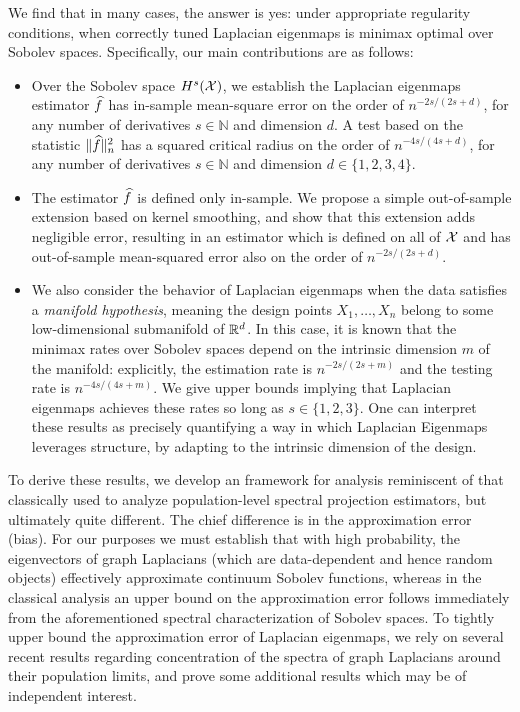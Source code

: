 We find that in many cases, the answer is yes: under appropriate regularity conditions, when correctly tuned Laplacian eigenmaps is minimax optimal over Sobolev spaces. Specifically, our main contributions are as follows:
\begin{itemize}
	\item Over the Sobolev space $H^{s}(\mathcal{X})$, we establish the Laplacian eigenmaps estimator $\widehat{f}$ has in-sample mean-square error on the order of $n^{-2s/(2s + d)}$, for any number of derivatives $s \in \mathbb{N}$ and dimension $d$. A test based on the statistic $\|\widehat{f}\|_n^2$ has a squared critical radius on the order of $n^{-4s/(4s + d)}$, for any number of derivatives $s \in \mathbb{N}$ and dimension $d \in \{1,2,3,4\}$. 
	\item The estimator $\widehat{f}$ is defined only in-sample. We propose a simple out-of-sample extension based on kernel smoothing, and show that this extension adds negligible error, resulting in an estimator which is defined on all of $\mathcal{X}$ and has out-of-sample mean-squared error also on the order of $n^{-2s/(2s + d)}$.
	\item We also consider the behavior of Laplacian eigenmaps when the data satisfies a \emph{manifold hypothesis}, meaning the design points $X_1,\ldots,X_n$ belong to some low-dimensional submanifold of $\mathbb{R}^d$. In this case, it is known that the minimax rates over Sobolev spaces depend on the intrinsic dimension $m$ of the manifold: explicitly, the estimation rate is $n^{-2s/(2s + m)}$ and the testing rate is $n^{-4s/(4s + m)}$. We give upper bounds implying that Laplacian eigenmaps achieves these rates so long as $s \in \{1,2,3\}$. One can interpret these results as precisely quantifying a way in which Laplacian Eigenmaps leverages structure, by adapting to the intrinsic dimension of the design.
\end{itemize}

To derive these results, we develop an framework for analysis reminiscent of that  classically used to analyze population-level spectral projection estimators, but ultimately quite different. The chief difference is in the approximation error (bias). For our purposes we must establish that with high probability, the eigenvectors of graph Laplacians (which are data-dependent and hence random objects) effectively approximate continuum Sobolev functions, whereas in the classical analysis an upper bound on the approximation error follows immediately from the aforementioned spectral characterization of Sobolev spaces. To tightly upper bound the approximation error of Laplacian eigenmaps, we rely on several recent results regarding concentration of the spectra of graph Laplacians around their population limits, and prove some additional results which may be of independent interest. 

